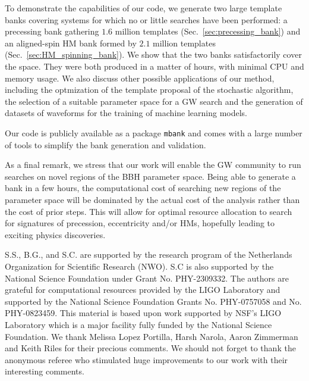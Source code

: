 \documentclass[twocolumn,showpacs,preprintnumbers,nofootinbib,prd,
superscriptaddress,10pt]{revtex4-2}
\begin{document}
To demonstrate the capabilities of our code, we generate two large template banks covering systems for which no or little searches have been performed: a precessing bank gathering $1.6$ million templates (Sec.~\ref{sec:precessing_bank}) and an aligned-spin HM bank formed by $2.1$ million templates (Sec.~\ref{sec:HM_spinning_bank}). We show that the two banks satisfactorily cover the space. They were both produced in a matter of hours, with minimal CPU and memory usage.
We also discuss other possible applications of our method, including the optmization of the template proposal of the stochastic algorithm, the selection of a suitable parameter space for a GW search and the generation of datasets of waveforms for the training of machine learning models.

Our code is publicly available as a package \texttt{mbank}\cite{mbank} and comes with a large number of tools to simplify the bank generation and validation.

As a final remark, we stress that our work will enable the GW community to run searches on novel regions of the BBH parameter space. Being able to generate a bank in a few hours, the computational cost of searching new regions of the parameter space will be dominated by the actual cost of the analysis rather than the cost of prior steps.
This will allow for optimal resource allocation to search for signatures of precession, eccentricity and/or HMs, hopefully leading to exciting physics discoveries.


        \begin{acknowledgments}
		S.S., B.G., and S.C. are supported by the research program of the Netherlands Organization for Scientific Research (NWO). S.C is also supported by the National Science Foundation under Grant No. PHY-2309332.
		The authors are grateful for computational resources provided by the LIGO Laboratory and supported by the National Science Foundation Grants No. PHY-0757058 and No. PHY-0823459. This material is based upon work supported by NSF’s LIGO Laboratory which is a major facility fully funded by the National Science Foundation.
		We thank Melissa Lopez Portilla, Harsh Narola, Aaron Zimmerman and Keith Riles for their precious comments. We should not forget to thank the anonymous referee who stimulated huge improvements to our work with their interesting comments.
        \end{acknowledgments}

\appendix
\end{document}
